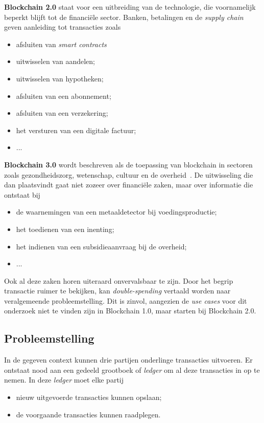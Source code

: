 \textbf{Blockchain 2.0} staat voor een uitbreiding van de technologie, die voornamelijk beperkt blijft tot de financiële sector. Banken, betalingen en de \textit{supply chain} geven aanleiding tot transacties zoals
\begin{itemize}
	\item afsluiten van \textit{smart contracts}
	\item uitwisselen van aandelen;
	\item uitwisselen van hypotheken;
	\item afsluiten van een abonnement;
	\item afsluiten van een verzekering;
	\item het versturen van een digitale factuur;
	\item ...
\end{itemize}
\textbf{Blockchain 3.0} wordt beschreven als de toepassing van blockchain in sectoren zoals gezondheidszorg, wetenschap, cultuur en de overheid~\autocite{Xu2019}. De uitwisseling die dan plaatsvindt gaat niet zozeer over financiële zaken, maar over informatie die ontstaat bij
\begin{itemize}
	\item de waarnemingen van een metaaldetector bij voedingsproductie;
	\item het toedienen van een inenting;
	\item het indienen van een subsidieaanvraag bij de overheid;
	\item ...
\end{itemize}

Ook al deze zaken horen uiteraard onvervalsbaar te zijn. Door het begrip transactie ruimer te bekijken, kan \textit{double-spending} vertaald worden naar veralgemeende probleemstelling. Dit is zinvol, aangezien de \textit{use cases} voor dit onderzoek niet te vinden zijn in Blockchain 1.0, maar starten bij Blockchain 2.0.


\subsection{Probleemstelling}
\label{sub:probleemstelling}

In de gegeven context kunnen drie partijen onderlinge transacties uitvoeren. Er ontstaat nood aan een gedeeld grootboek of \textit{ledger} om al deze transacties in op te nemen. In deze \textit{ledger} moet elke partij
\begin{itemize}
	\item nieuw uitgevoerde transacties kunnen opslaan;
	\item de voorgaande transacties kunnen raadplegen.
\end{itemize}

